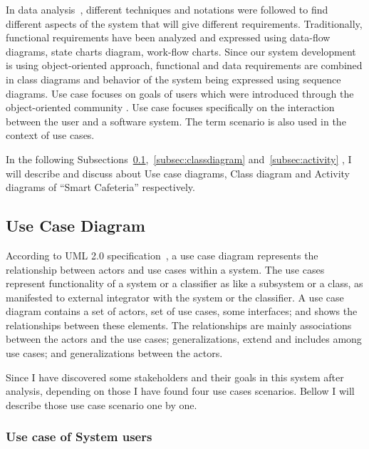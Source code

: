 In data analysis~\cite{preece2002interaction}, different techniques and
notations were followed to find different aspects of the system that will give
different requirements. Traditionally, functional requirements have been
analyzed and expressed using data-flow diagrams, state charts diagram, work-flow
charts. Since our system development is using object-oriented approach,
functional and data requirements are combined in class diagrams and behavior of
the system being expressed using sequence diagrams. Use case focuses on goals of
users which were introduced through the object-oriented community . Use case
focuses specifically on the interaction between the user and a software system.
The term scenario is also used in the context of use cases.

In the following Subsections~\ref{subsec:usecase},~\ref{subsec:classdiagram}
and~\ref{subsec:activity} , I will describe and discuss about Use case diagrams,
Class diagram and Activity diagrams of ``Smart Cafeteria'' respectively.

\subsection{Use Case Diagram}
\label{subsec:usecase}
According to UML 2.0  specification~\cite{UML:2007:Specification}, a use case
diagram represents the relationship between actors and use cases within a
system. The use cases represent functionality of a system or a classifier as
like a subsystem or a class, as manifested to external integrator with the
system or the classifier. A use case diagram contains a set of actors, set of
use cases, some interfaces; and shows the relationships between these elements.
The relationships are mainly associations between the actors and the use cases;
generalizations, extend and includes among use cases; and generalizations
between the actors.

Since I have discovered some stakeholders and their goals in this system after
analysis, depending on those I have found four use cases scenarios. Bellow I
will describe those use case scenario one by one.

\subsubsection{Use case of System users}

